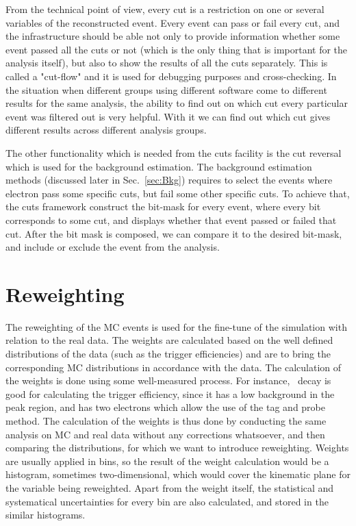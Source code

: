 From the technical point of view, every cut is a restriction on one or several variables of the reconstructed event. Every event can pass or fail every cut, and the infrastructure should be able not only to provide information whether some event passed all the cuts or not (which is the only thing that is important for the analysis itself), but also to show the results of all the cuts separately. This is called a "cut-flow" and it is used for debugging purposes and cross-checking. In the situation when different groups using different software come to different results for the same analysis, the ability to find out on which cut every particular event was filtered out is very helpful. With it we can find out which cut gives different results across different analysis groups.

The other functionality which is needed from the cuts facility is the cut reversal which is used for the background estimation. The background estimation methods (discussed later in Sec.~\ref{sec:Bkg}) requires to select the events where electron pass some specific cuts, but fail some other specific cuts. To achieve that, the cuts framework construct the bit-mask for every event, where every bit corresponds to some cut, and displays whether that event passed or failed that cut. After the bit mask is composed, we can compare it to the desired bit-mask, and include or exclude the event from the analysis.

\section{Reweighting}

The reweighting of the MC events is used for the fine-tune of the simulation with relation to the real data. The weights are calculated based on the well defined distributions of the data (such as the trigger efficiencies) and are to bring the corresponding MC distributions in accordance with the data. The calculation of the weights is done using some well-measured process. For instance, \Zee\ decay is good for calculating the trigger efficiency, since it has a low background in the peak region, and has two electrons which allow the use of the tag and probe method. The calculation of the weights is thus done by conducting the same analysis on MC and real data without any corrections whatsoever, and then comparing the distributions, for which we want to introduce reweighting. Weights are usually applied in bins, so the result of the weight calculation would be a histogram, sometimes two-dimensional, which would cover the kinematic plane for the variable being reweighted. Apart from the weight itself, the statistical and systematical uncertainties for every bin are also calculated, and stored in the similar histograms.

